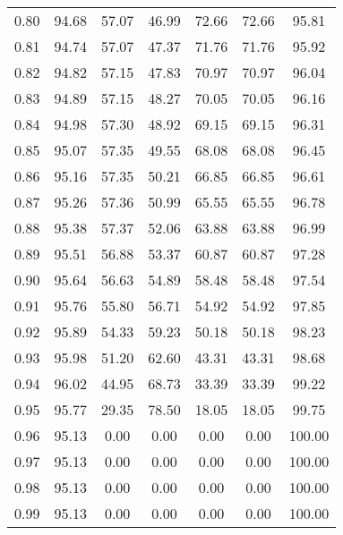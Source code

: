 \begin{tabular}{|c|c|c|c|c|c|c|}
      0.80 &     94.68 &     57.07 &      46.99 &   72.66 &      72.66 &         95.81 \\
      0.81 &     94.74 &     57.07 &      47.37 &   71.76 &      71.76 &         95.92 \\
      0.82 &     94.82 &     57.15 &      47.83 &   70.97 &      70.97 &         96.04 \\
      0.83 &     94.89 &     57.15 &      48.27 &   70.05 &      70.05 &         96.16 \\
      0.84 &     94.98 &     57.30 &      48.92 &   69.15 &      69.15 &         96.31 \\
      0.85 &     95.07 &     57.35 &      49.55 &   68.08 &      68.08 &         96.45 \\
      0.86 &     95.16 &     57.35 &      50.21 &   66.85 &      66.85 &         96.61 \\
      0.87 &     95.26 &     57.36 &      50.99 &   65.55 &      65.55 &         96.78 \\
      0.88 &     95.38 &     57.37 &      52.06 &   63.88 &      63.88 &         96.99 \\
      0.89 &     95.51 &     56.88 &      53.37 &   60.87 &      60.87 &         97.28 \\
      0.90 &     95.64 &     56.63 &      54.89 &   58.48 &      58.48 &         97.54 \\
      0.91 &     95.76 &     55.80 &      56.71 &   54.92 &      54.92 &         97.85 \\
      0.92 &     95.89 &     54.33 &      59.23 &   50.18 &      50.18 &         98.23 \\
      0.93 &     95.98 &     51.20 &      62.60 &   43.31 &      43.31 &         98.68 \\
      0.94 &     96.02 &     44.95 &      68.73 &   33.39 &      33.39 &         99.22 \\
      0.95 &     95.77 &     29.35 &      78.50 &   18.05 &      18.05 &         99.75 \\
      0.96 &     95.13 &      0.00 &       0.00 &    0.00 &       0.00 &        100.00 \\
      0.97 &     95.13 &      0.00 &       0.00 &    0.00 &       0.00 &        100.00 \\
      0.98 &     95.13 &      0.00 &       0.00 &    0.00 &       0.00 &        100.00 \\
      0.99 &     95.13 &      0.00 &       0.00 &    0.00 &       0.00 &        100.00 \\
\bottomrule
\end{tabular}
